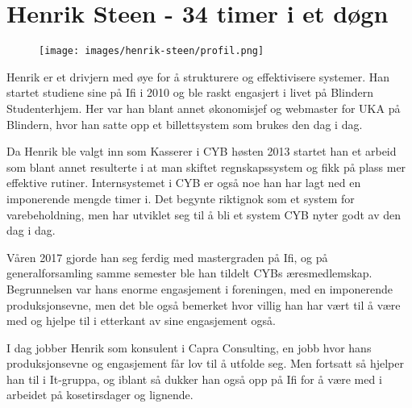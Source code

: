 \chapter[Henrik Steen]{Henrik Steen - 34 timer i et døgn}

\author{Skrevet av Arne Hassel}

\begin{figure}
	\texttt{[image: images/henrik-steen/profil.png]}
	\label{fig:henrik-steen}
\end{figure}

Henrik er et drivjern med øye for å strukturere og effektivisere systemer. Han startet studiene sine på Ifi i 2010 og ble raskt engasjert i livet på Blindern Studenterhjem. Her var han blant annet økonomisjef og webmaster for UKA på Blindern, hvor han satte opp et billettsystem som brukes den dag i dag.

Da Henrik ble valgt inn som Kasserer i CYB høsten 2013 startet han et arbeid som blant annet resulterte i at man skiftet regnskapssystem og fikk på plass mer effektive rutiner. Internsystemet i CYB er også noe han har lagt ned en imponerende mengde timer i. Det begynte riktignok som et system for varebeholdning, men har utviklet seg til å bli et system CYB nyter godt av den dag i dag.

Våren 2017 gjorde han seg ferdig med mastergraden på Ifi, og på generalforsamling samme semester ble han tildelt CYBs æresmedlemskap. Begrunnelsen var hans enorme engasjement i foreningen, med en imponerende produksjonsevne, men det ble også bemerket hvor villig han har vært til å være med og hjelpe til i etterkant av sine engasjement også.

I dag jobber Henrik som konsulent i Capra Consulting, en jobb hvor hans produksjonsevne og engasjement får lov til å utfolde seg. Men fortsatt så hjelper han til i It-gruppa, og iblant så dukker han også opp på Ifi for å være med i arbeidet på kosetirsdager og lignende.
